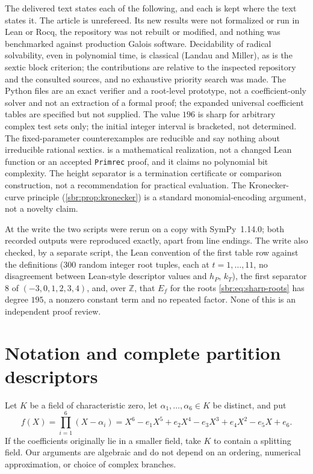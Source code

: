 \documentclass[11pt,letterpaper]{article}
\numberwithin{equation}{section}
\theoremstyle{definition}
\theoremstyle{remark}
\newcommand{\ZZ}{\mathbb Z}
\newcommand{\src}[1]{\texttt{\nolinkurl{#1}}}
\begin{document}
The delivered text states each of the following, and each is kept where
the text states it. The article is unrefereed. Its new results were not
formalized or run in Lean or Rocq, the repository was not rebuilt or
modified, and nothing was benchmarked against production Galois software.
Decidability of radical solvability, even in polynomial time, is classical
(Landau and Miller), as is the sextic block criterion; the contributions are
relative to the inspected repository and the consulted sources, and no
exhaustive priority search was made. The Python files are an exact
verifier and a root-level prototype, not a coefficient-only solver and not
an extraction of a formal proof; the expanded universal coefficient tables
are specified but not supplied. The value $196$ is sharp for arbitrary
complex test sets only; the initial integer interval is bracketed, not
determined. The fixed-parameter counterexamples are reducible and say
nothing about irreducible rational sextics.  is a
mathematical realization, not a changed Lean function or an accepted
\src{Primrec} proof, and it claims no polynomial bit complexity. The height
separator is a termination certificate or comparison construction, not a
recommendation for practical evaluation. The Kronecker-curve principle
(\cref{sbr:prop:kronecker}) is a standard monomial-encoding argument, not a
novelty claim.

At the write the two scripts were rerun on a copy with SymPy~1.14.0; both
recorded outputs were reproduced exactly, apart from line endings. The
write also checked, by a separate script, the Lean convention of the first
table row against the definitions (300 random integer root tuples, each at $t=1,\ldots,11$, no
disagreement between Lean-style descriptor values and $h_P$, $k_T$), the
first separator $8$ of $(-3,0,1,2,3,4)$, and, over $\ZZ$, that $E_f$ for
the roots \cref{sbr:eq:sharp-roots} has degree $195$, a nonzero constant
term and no repeated factor. None of this is an independent proof review.

\section{Notation and complete partition descriptors}
\label{sbr:sec:descriptors}

Let $K$ be a field of characteristic zero, let
$\alpha_1,\ldots,\alpha_6\in K$ be distinct, and put
\begin{equation}
 f(X)=\prod_{i=1}^6(X-\alpha_i)
     =X^6-e_1X^5+e_2X^4-e_3X^3+e_4X^2-e_5X+e_6.
 \label{sbr:eq:sextic}
\end{equation}
If the coefficients originally lie in a smaller field, take $K$ to contain
a splitting field. Our arguments are algebraic and do not depend on an
ordering, numerical approximation, or choice of complex branches.
\end{document}

